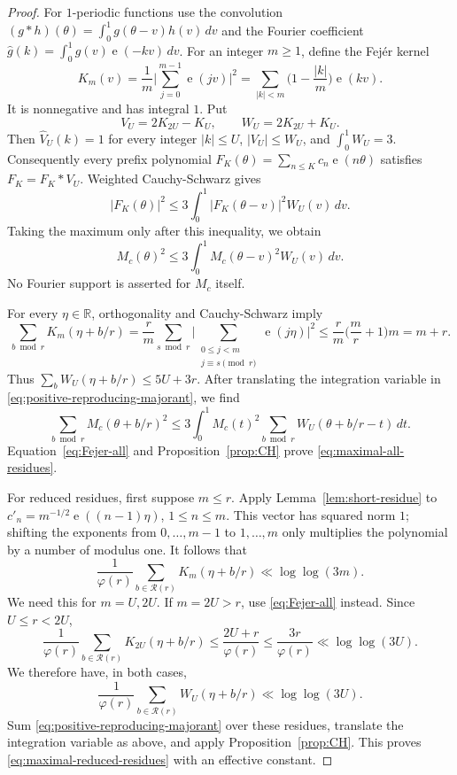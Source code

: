 \documentclass[11pt]{amsart}
\numberwithin{equation}{section}
\numberwithin{figure}{section}
\theoremstyle{definition}
\newcommand{\R}{\mathbb{R}}
\newcommand{\e}{\operatorname{e}}
\begin{document}
\begin{proof}
For $1$-periodic functions use the convolution
$(g*h)(\theta)=\int_0^1g(\theta-v)h(v)\,dv$ and the Fourier coefficient
$\widehat g(k)=\int_0^1g(v)\e(-kv)\,dv$.
For an integer $m\ge1$, define the Fej\'er kernel
\[
 K_m(v)=\frac1m\bigg|\sum_{j=0}^{m-1}\e(jv)\bigg|^2
       =\sum_{|k|<m}\Big(1-\frac{|k|}m\Big)\e(kv).
\]
It is nonnegative and has integral $1$. Put
\[
 V_U=2K_{2U}-K_U,\qquad W_U=2K_{2U}+K_U.
\]
Then $\widehat V_U(k)=1$ for every integer $|k|\le U$,
$|V_U|\le W_U$, and $\int_0^1W_U=3$.
Consequently every prefix polynomial
$F_K(\theta)=\sum_{n\le K}c_n\e(n\theta)$ satisfies $F_K=F_K*V_U$.
Weighted Cauchy-Schwarz gives
\[
 |F_K(\theta)|^2
 \le 3\int_0^1 |F_K(\theta-v)|^2 W_U(v)\,dv.
\]
Taking the maximum only after this inequality, we obtain
\begin{equation}\label{eq:positive-reproducing-majorant}
 M_c(\theta)^2\le
 3\int_0^1M_c(\theta-v)^2W_U(v)\,dv.
\end{equation}
No Fourier support is asserted for $M_c$ itself.

For every $\eta\in\R$, orthogonality and Cauchy-Schwarz imply
\begin{equation}\label{eq:Fejer-all}
 \sum_{b\bmod r}K_m(\eta+b/r)
 =\frac rm\sum_{s\bmod r}
       \bigg|\sum_{\substack{0\le j<m\\j\equiv s\pmod r}}
                         \e(j\eta)\bigg|^2
 \le\frac rm\Big(\frac mr+1\Big)m=m+r.
\end{equation}
Thus $\sum_bW_U(\eta+b/r)\le5U+3r$.
After translating the integration variable in
\eqref{eq:positive-reproducing-majorant}, we find
\[
 \sum_{b\bmod r}M_c(\theta+b/r)^2
 \le3\int_0^1M_c(t)^2\sum_{b\bmod r}W_U(\theta+b/r-t)\,dt.
\]
Equation~\eqref{eq:Fejer-all} and Proposition~\ref{prop:CH}
prove \eqref{eq:maximal-all-residues}.

For reduced residues, first suppose $m\le r$.
Apply Lemma~\ref{lem:short-residue} to
$c'_n=m^{-1/2}\e((n-1)\eta)$, $1\le n\le m$.
This vector has squared norm $1$; shifting the exponents from
$0,\ldots,m-1$ to $1,\ldots,m$ only multiplies the polynomial by a
number of modulus one. It follows that
\[
 \frac1{\varphi(r)}\sum_{b\in\mathcal R(r)}K_m(\eta+b/r)
 \ll\log\log(3m).
\]
We need this for $m=U,2U$. If $m=2U>r$, use
\eqref{eq:Fejer-all} instead. Since $U\le r<2U$,
\[
 \frac1{\varphi(r)}\sum_{b\in\mathcal R(r)}K_{2U}(\eta+b/r)
 \le\frac{2U+r}{\varphi(r)}
 \le\frac{3r}{\varphi(r)}\ll\log\log(3U).
\]
We therefore have, in both cases,
\[
 \frac1{\varphi(r)}\sum_{b\in\mathcal R(r)}W_U(\eta+b/r)
 \ll\log\log(3U).
\]
Sum \eqref{eq:positive-reproducing-majorant} over these residues,
translate the integration variable as above, and apply
Proposition~\ref{prop:CH}. This proves
\eqref{eq:maximal-reduced-residues} with an effective constant.
\end{proof}
\end{document}
